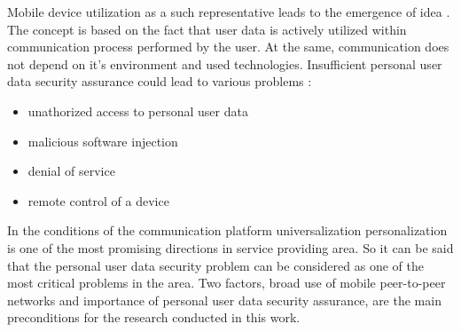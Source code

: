 %
Mobile device utilization as a such representative leads to the emergence of  idea . 
%
The  concept is based on the fact that user data is actively utilized within communication process performed by the user. 
%
At the same, communication does not depend on it's environment and used technologies. 
%
Insufficient personal user data security assurance could lead to various problems :
\begin{itemize}
	\item unathorized access to personal user data
	\item malicious software injection
	\item denial of service
	\item remote control of a device
\end{itemize}

%
In the conditions of the communication platform universalization\T{,} personalization is one of the most promising directions in service providing area. 
%
So it can be said that the personal user data security problem can be considered as one of the most critical problems in the area. 
%
Two factors, broad use of mobile peer-to-peer networks and importance of personal user data security assurance, are the main preconditions for the research conducted in this work. 